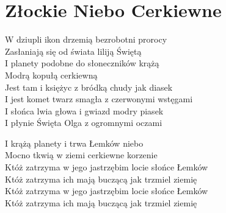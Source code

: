 \section{Złockie Niebo Cerkiewne}
\begin{text}
W dziupli ikon drzemią bezrobotni prorocy\\
Zasłaniają się od świata liliją Świętą\\
I planety podobne do słoneczników krążą\\
Modrą kopułą cerkiewną\\

\vin Jest tam i księżyc z bródką chudy jak diasek\\
\vin I jest komet twarz smagła z czerwonymi wstęgami\\
\vin I słońca lwia głowa i gwiazd modry piasek\\
\vin I płynie Święta Olga z ogromnymi oczami

I krążą planety i trwa Łemków niebo\\
Mocno tkwią w ziemi cerkiewne korzenie\\
Któż zatrzyma w jego jastrzębim locie słońce Łemków\\
Któż zatrzyma ich mają buczącą jak trzmiel ziemię\\
Któż zatrzyma w jego jastrzębim locie słońce Łemków\\
Któż zatrzyma ich mają buczącą jak trzmiel ziemię
\end{text}